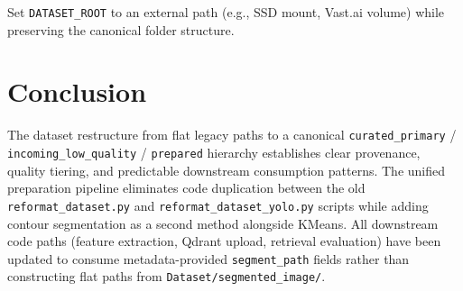 \documentclass[11pt]{article}
\begin{document}
Set \texttt{DATASET\_ROOT} to an external path (e.g., SSD mount, Vast.ai volume)
while preserving the canonical folder structure.

\section{Conclusion}

The dataset restructure from flat legacy paths to a canonical
\texttt{curated\_primary} / \texttt{incoming\_low\_quality} / \texttt{prepared}
hierarchy establishes clear provenance, quality tiering, and predictable
downstream consumption patterns. The unified preparation pipeline eliminates
code duplication between the old \texttt{reformat\_dataset.py} and
\texttt{reformat\_dataset\_yolo.py} scripts while adding contour segmentation
as a second method alongside KMeans. All downstream code paths (feature
extraction, Qdrant upload, retrieval evaluation) have been updated to consume
metadata-provided \texttt{segment\_path} fields rather than constructing flat
paths from \texttt{Dataset/segmented\_image/}.
\end{document}
